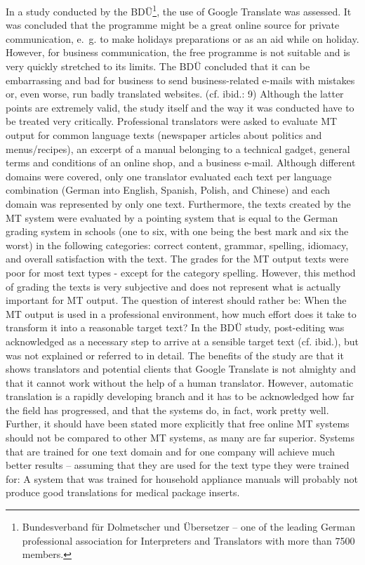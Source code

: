 \documentclass[output=paper]{langsci/langscibook}
\begin{document}
In a study conducted by the BDÜ\footnote{Bundesverband für Dolmetscher und Übersetzer – one of the leading German professional association for Interpreters and Translators with more than 7500 members.}\citep{bdü2012}, the use of Google Translate was assessed. It was concluded that the programme might be a great online source for private communication, e.~g. to make holidays preparations or as an aid while on holiday. However, for business communication, the free programme is not suitable and is very quickly stretched to its limits. The BDÜ concluded that it can be embarrassing and bad for business to send business-related e\nobreakdash-mails with mistakes or, even worse, run badly translated websites. (cf. ibid.: 9) Although the latter points are extremely valid, the study itself and the way it was conducted have to be treated very critically. Professional translators were asked to evaluate MT output for common language texts (newspaper articles about politics and menus/recipes), an excerpt of a manual belonging to a technical gadget, general terms and conditions of an online shop, and a business e\nobreakdash-mail. Although different domains were covered, only one translator evaluated each text per language combination (German into English, Spanish, Polish, and Chinese) and each domain was represented by only one text. Furthermore, the texts created by the MT system were evaluated by a pointing system that is equal to the German grading system in schools (one to six, with one being the best mark and six the worst) in the following categories: correct content, grammar, spelling, idiomacy, and overall satisfaction with the text. The grades for the MT output texts were poor for most text types - except for the category spelling. However, this method of grading the texts is very subjective and does not represent what is actually important for MT output. The question of interest should rather be: When the MT output is used in a professional environment, how much effort does it take to transform it into a reasonable target text? In the BDÜ study, post-editing was acknowledged as a necessary step to arrive at a sensible target text (cf. ibid.), but was not explained or referred to in detail. The benefits of the study are that it shows translators and potential clients that Google Translate is not almighty and that it cannot work without the help of a human translator. However, automatic translation is a rapidly developing branch and it has to be acknowledged how far the field has progressed, and that the systems do, in fact, work pretty well. Further, it should have been stated more explicitly that free online MT systems should not be compared to other MT systems, as many are far superior. Systems that are trained for one text domain and for one company will achieve much better results – assuming that they are used for the text type they were trained for: A system that was trained for household appliance manuals will probably not produce good translations for medical package inserts.
\end{document}
